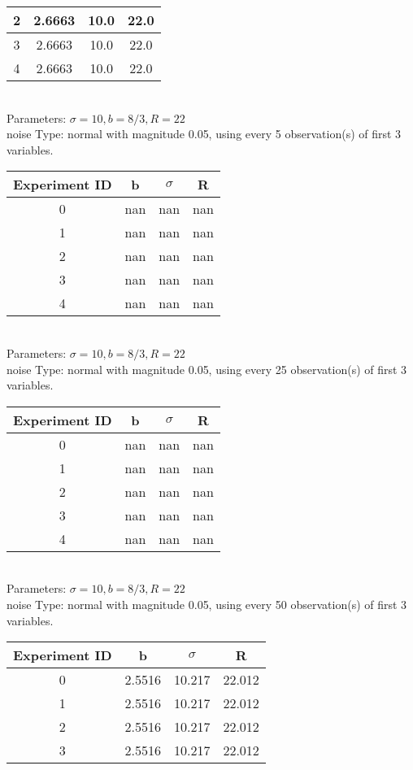 \begin{multicols}{3}
\begin{tabular}{cccc}
 2 & 2.6663 & 10.0 & 22.0\\ \hline 
 3 & 2.6663 & 10.0 & 22.0\\ \hline 
 4 & 2.6663 & 10.0 & 22.0\\ \hline 
 \end{tabular}\\
Parameters: $\sigma=10, b=8/3, R=22$\\
noise Type: normal with magnitude 0.05, using every 5 observation(s) of first 3 variables.\\
\begin{tabular}{cccc}
\hline Experiment ID & b & $\sigma$ & R \\ \hline 
0 & nan & nan & nan\\ \hline 
 1 & nan & nan & nan\\ \hline 
 2 & nan & nan & nan\\ \hline 
 3 & nan & nan & nan\\ \hline 
 4 & nan & nan & nan\\ \hline 
 \end{tabular}\\
Parameters: $\sigma=10, b=8/3, R=22$\\
noise Type: normal with magnitude 0.05, using every 25 observation(s) of first 3 variables.\\
\begin{tabular}{cccc}
\hline Experiment ID & b & $\sigma$ & R \\ \hline 
0 & nan & nan & nan\\ \hline 
 1 & nan & nan & nan\\ \hline 
 2 & nan & nan & nan\\ \hline 
 3 & nan & nan & nan\\ \hline 
 4 & nan & nan & nan\\ \hline 
 \end{tabular}\\
Parameters: $\sigma=10, b=8/3, R=22$\\
noise Type: normal with magnitude 0.05, using every 50 observation(s) of first 3 variables.\\
\begin{tabular}{cccc}
\hline Experiment ID & b & $\sigma$ & R \\ \hline 
0 & 2.5516 & 10.217 & 22.012\\ \hline 
 1 & 2.5516 & 10.217 & 22.012\\ \hline 
 2 & 2.5516 & 10.217 & 22.012\\ \hline 
 3 & 2.5516 & 10.217 & 22.012\\ \hline 

\end{tabular}
\end{multicols}
